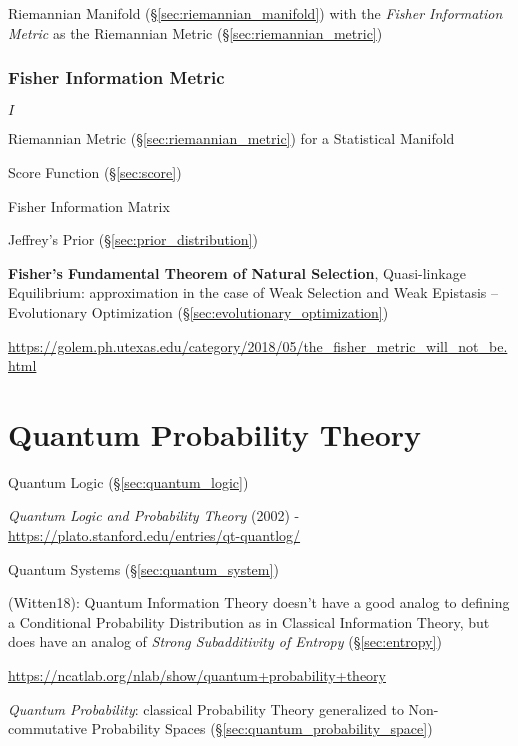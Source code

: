 Riemannian Manifold (\S\ref{sec:riemannian_manifold}) with the
\emph{Fisher Information Metric} as the Riemannian Metric
(\S\ref{sec:riemannian_metric})



\subsubsection{Fisher Information Metric}\label{sec:fisher_metric}

$I$

Riemannian Metric (\S\ref{sec:riemannian_metric}) for a Statistical Manifold

Score Function (\S\ref{sec:score})

Fisher Information Matrix

Jeffrey's Prior (\S\ref{sec:prior_distribution})

\fist \textbf{Fisher's Fundamental Theorem of Natural Selection},
Quasi-linkage Equilibrium: approximation in the case of Weak Selection
and Weak Epistasis -- Evolutionary Optimization
(\S\ref{sec:evolutionary_optimization}) %

\url{https://golem.ph.utexas.edu/category/2018/05/the_fisher_metric_will_not_be.html}



\section{Quantum Probability Theory}\label{sec:quantum_probability}

Quantum Logic (\S\ref{sec:quantum_logic})

\emph{Quantum Logic and Probability Theory} (2002) -
\url{https://plato.stanford.edu/entries/qt-quantlog/}

Quantum Systems (\S\ref{sec:quantum_system})

(Witten18): Quantum Information Theory doesn't have a good analog to defining a
Conditional Probability Distribution as in Classical Information Theory, but
does have an analog of \emph{Strong Subadditivity of Entropy}
(\S\ref{sec:entropy})

\url{https://ncatlab.org/nlab/show/quantum+probability+theory}

\emph{Quantum Probability}: classical Probability Theory generalized to
Non-commutative Probability Spaces (\S\ref{sec:quantum_probability_space})

